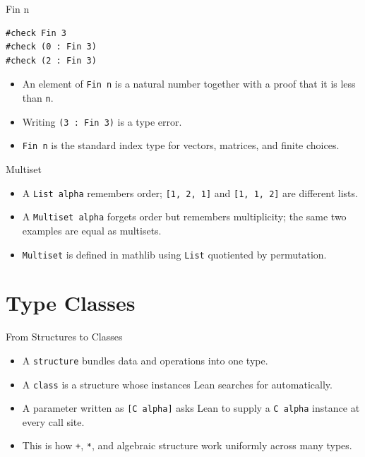 ﻿\documentclass[aspectratio=169,11pt]{beamer}
\newcommand{\DTwoPartName}{Overview}
\newcommand{\setDTwoPart}[1]{\gdef\DTwoPartName{#1}}
\begin{document}
\begin{frame}[fragile]{Fin n}
  \begin{lstlisting}
#check Fin 3
#check (0 : Fin 3)
#check (2 : Fin 3)
  \end{lstlisting}

  \begin{itemize}
    \item An element of \texttt{Fin n} is a natural number together with a proof that it is less than \texttt{n}.
    \item Writing \texttt{(3 : Fin 3)} is a type error.
    \item \texttt{Fin n} is the standard index type for vectors, matrices, and finite choices.
  \end{itemize}
\end{frame}

\begin{frame}{Multiset}
  \begin{itemize}
    \item A \texttt{List alpha} remembers order; \texttt{[1, 2, 1]} and \texttt{[1, 1, 2]} are different lists.
    \item A \texttt{Multiset alpha} forgets order but remembers multiplicity; the same two examples are equal as multisets.
    \item \texttt{Multiset} is defined in mathlib using \texttt{List} quotiented by permutation.
  \end{itemize}
\end{frame}

\setDTwoPart{Part IV: Type Classes}
\section{Type Classes}

\begin{frame}{From Structures to Classes}
  \hypertarget{part-type-classes}{}
  \begin{itemize}
    \item A \texttt{structure} bundles data and operations into one type.
    \item A \texttt{class} is a structure whose instances Lean searches for automatically.
    \item A parameter written as \texttt{[C alpha]} asks Lean to supply a \texttt{C alpha} instance at every call site.
    \item This is how \texttt{+}, \texttt{*}, and algebraic structure work uniformly across many types.
  \end{itemize}
\end{frame}
\end{document}
